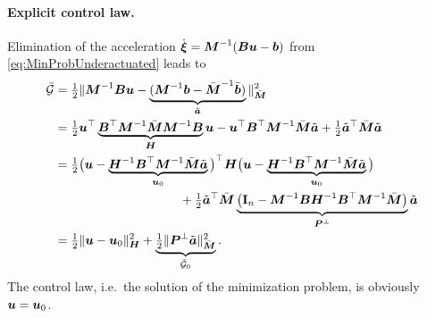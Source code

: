 \paragraph{Explicit control law.}
Elimination of the acceleration $\dot{\boldsymbol{\xi}} = \boldsymbol{M}^{-1}(\boldsymbol{B} \boldsymbol{u} - \boldsymbol{b})$ from \eqref{eq:MinProbUnderactuated} leads to
\begin{align}\label{eq:GaussianUnderactuated}
 \GaussianConstraintC &= \tfrac{1}{2} \norm[\sysInertiaMatC]{\sysInertiaMat^{-1}\sysInputMat \sysInput - \underbrace{(\sysInertiaMat^{-1}\sysForce - \sysInertiaMatC^{-1}\sysForceC)}_{\tilde{\tuple{a}}}}^2
\nonumber\\
 &= \tfrac{1}{2} \sysInput^\top \underbrace{\sysInputMat^\top \sysInertiaMat^{-1} \sysInertiaMatC \sysInertiaMat^{-1} \sysInputMat}_{\mat{H}} \sysInput - \sysInput^\top \sysInputMat^\top \sysInertiaMat^{-1} \sysInertiaMatC \tilde{\tuple{a}} + \tfrac{1}{2} \tilde{\tuple{a}}^\top \sysInertiaMatC \tilde{\tuple{a}}
\nonumber\\
 &= \tfrac{1}{2} \big( \sysInput - \underbrace{\mat{H}^{-1} \sysInputMat^\top \sysInertiaMat^{-1} \sysInertiaMatC \tilde{\tuple{a}}}_{\sysInput_0} \big)^\top \mat{H} \big(\sysInput - \underbrace{\mat{H}^{-1} \sysInputMat^\top \sysInertiaMat^{-1} \sysInertiaMatC \tilde{\tuple{a}}}_{\sysInput_0} \big)
\nonumber\\
 &\hspace{10em}+ \tfrac{1}{2} \tilde{\tuple{a}}^\top \sysInertiaMatC \underbrace{\big( \idMat[\dimConfigSpace] - \sysInertiaMat^{-1} \sysInputMat \mat{H}^{-1} \sysInputMat^\top \sysInertiaMat^{-1} \sysInertiaMatC \big)}_{\mat{P}^\bot} \tilde{\tuple{a}}
\nonumber\\
 &= \tfrac{1}{2} \norm[\mat{H}]{\sysInput - \sysInput_0}^2 + \underbrace{\tfrac{1}{2} \norm[\sysInertiaMatC]{\mat{P}^\bot \tilde{\tuple{a}}}^2}_{\GaussianConstraintC_0}.
\end{align}
The control law, i.e.\ the solution of the minimization problem, is obviously $\boldsymbol{u} = \boldsymbol{u}_0$.

